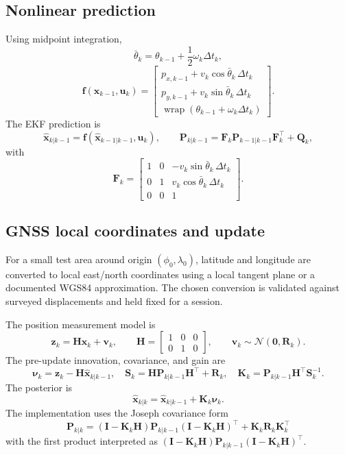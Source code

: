 \documentclass[11pt,a4paper]{article}
\newcommand{\wrap}{\operatorname{wrap}}
\begin{document}
\subsection{Nonlinear prediction}

Using midpoint integration,
\[
\bar\theta_k=\theta_{k-1}+\frac{1}{2}\omega_k\Delta t_k,
\]
\[
\mathbf f(\mathbf x_{k-1},\mathbf u_k)=
\begin{bmatrix}
p_{x,k-1}+v_k\cos\bar\theta_k\,\Delta t_k\\
p_{y,k-1}+v_k\sin\bar\theta_k\,\Delta t_k\\
\wrap(\theta_{k-1}+\omega_k\Delta t_k)
\end{bmatrix}.
\]
The EKF prediction is
\[
\hat{\mathbf x}_{k|k-1}=\mathbf f(\hat{\mathbf x}_{k-1|k-1},\mathbf u_k),
\qquad
\mathbf P_{k|k-1}=\mathbf F_k\mathbf P_{k-1|k-1}\mathbf F_k^\top+\mathbf Q_k,
\]
with
\[
\mathbf F_k=
\begin{bmatrix}
1&0&-v_k\sin\bar\theta_k\,\Delta t_k\\
0&1& v_k\cos\bar\theta_k\,\Delta t_k\\
0&0&1
\end{bmatrix}.
\]

\subsection{GNSS local coordinates and update}

For a small test area around origin $(\phi_0,\lambda_0)$, latitude and
longitude are converted to local east/north coordinates using a local tangent
plane or a documented WGS84 approximation. The chosen conversion is validated
against surveyed displacements and held fixed for a session.

The position measurement model is
\[
\mathbf z_k=\mathbf H\mathbf x_k+\mathbf v_k,\qquad
\mathbf H=\begin{bmatrix}1&0&0\\0&1&0\end{bmatrix},\qquad
\mathbf v_k\sim\mathcal N(\mathbf0,\mathbf R_k).
\]
The pre-update innovation, covariance, and gain are
\[
\boldsymbol\nu_k=\mathbf z_k-\mathbf H\hat{\mathbf x}_{k|k-1},
\quad
\mathbf S_k=\mathbf H\mathbf P_{k|k-1}\mathbf H^\top+\mathbf R_k,
\quad
\mathbf K_k=\mathbf P_{k|k-1}\mathbf H^\top\mathbf S_k^{-1}.
\]
The posterior is
\[
\hat{\mathbf x}_{k|k}=\hat{\mathbf x}_{k|k-1}+\mathbf K_k\boldsymbol\nu_k.
\]
The implementation uses the Joseph covariance form
\[
\mathbf P_{k|k}=
(\mathbf I-\mathbf K_k\mathbf H)\mathbf P_{k|k-1}
(\mathbf I-\mathbf K_k\mathbf H)^\top
+\mathbf K_k\mathbf R_k\mathbf K_k^\top
\]
with the first product interpreted as
$(\mathbf I-\mathbf K_k\mathbf H)\mathbf P_{k|k-1}
(\mathbf I-\mathbf K_k\mathbf H)^\top$.
\end{document}
